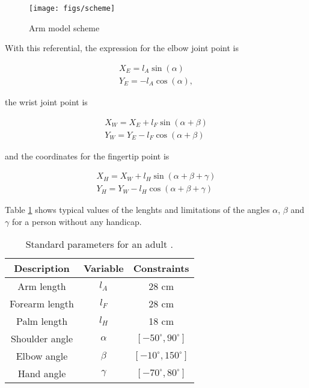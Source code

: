 \begin{figure}[!h]
  \centering
  \texttt{[image: figs/scheme]}
\caption{Arm model scheme}
\label{fig:armmodel}
\end{figure}
 

With this referential, the expression for the elbow joint point is

\begin{align}\label{firstcoord}
X_E = l_A\sin(\alpha) \\
Y_E = -l_A\cos(\alpha),
\end{align}

the wrist joint point is

\begin{align}
X_W = X_E + l_F\sin(\alpha+\beta) \\
Y_W = Y_E - l_F\cos(\alpha+\beta)
\end{align}

and the coordinates for the fingertip point is

\begin{align}
X_H = X_W + l_H\sin(\alpha+\beta+\gamma) \\
Y_H = Y_W - l_H\cos(\alpha+\beta+\gamma) \label{lastcoord}
\end{align}


Table \ref{tab:parameters} shows typical values of the lenghts and limitations of the angles $\alpha$, $\beta$ and $\gamma$ for a person without any handicap. %

\begin{table}[!h]
\begin{center}
\begin{tabular}{|c|c|c|}
\hline
\bf Description & \bf Variable & \bf Constraints \\\hline
Arm length & $l_A$ &  28 cm \\\hline
Forearm length  & $l_F$ &  28 cm \\\hline
Palm length & $l_H$ &  18 cm  \\\hline
Shoulder angle & $\alpha$ & $[-50^{\circ},90^{\circ}]$ \\\hline
Elbow angle & $\beta$  & $[-10^{\circ},150^{\circ}]$  \\\hline
Hand angle & $\gamma$ & $[-70^{\circ},80^{\circ}]$  \\\hline
\end{tabular}
\caption{Standard parameters for an adult \cite{MR2345192}.}
\label{tab:parameters}
\end{center}
\end{table}

